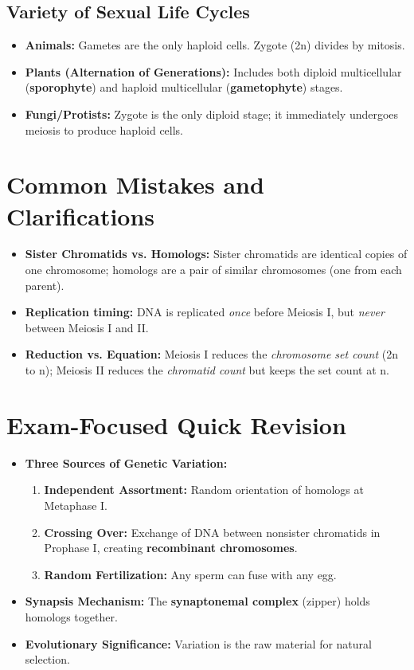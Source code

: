\documentclass[11pt, a4paper]{article}
\begin{document}
\subsection*{Variety of Sexual Life Cycles}
\begin{itemize}
    \item \textbf{Animals:} Gametes are the only haploid cells. Zygote (2n) divides by mitosis.
    \item \textbf{Plants (Alternation of Generations):} Includes both diploid multicellular (\textbf{sporophyte}) and haploid multicellular (\textbf{gametophyte}) stages.
    \item \textbf{Fungi/Protists:} Zygote is the only diploid stage; it immediately undergoes meiosis to produce haploid cells.
\end{itemize}

\section*{Common Mistakes and Clarifications}
\begin{itemize}
    \item \textbf{Sister Chromatids vs. Homologs:} Sister chromatids are identical copies of one chromosome; homologs are a pair of similar chromosomes (one from each parent).
    \item \textbf{Replication timing:} DNA is replicated \textit{once} before Meiosis I, but \textit{never} between Meiosis I and II.
    \item \textbf{Reduction vs. Equation:} Meiosis I reduces the \textit{chromosome set count} (2n to n); Meiosis II reduces the \textit{chromatid count} but keeps the set count at n.
\end{itemize}

\section*{Exam-Focused Quick Revision}
\begin{itemize}
    \item \textbf{Three Sources of Genetic Variation:}
    \begin{enumerate}
        \item \textbf{Independent Assortment:} Random orientation of homologs at Metaphase I.
        \item \textbf{Crossing Over:} Exchange of DNA between nonsister chromatids in Prophase I, creating \textbf{recombinant chromosomes}.
        \item \textbf{Random Fertilization:} Any sperm can fuse with any egg.
    \end{enumerate}
    \item \textbf{Synapsis Mechanism:} The \textbf{synaptonemal complex} (zipper) holds homologs together.
    \item \textbf{Evolutionary Significance:} Variation is the raw material for natural selection.
\end{itemize}
\end{document}
